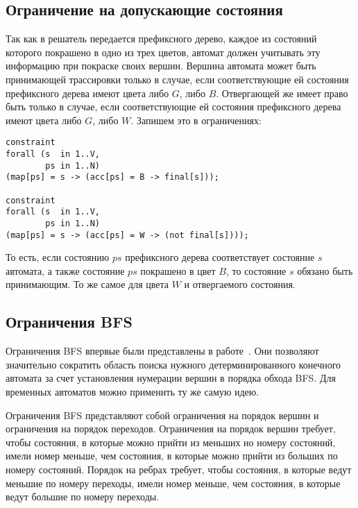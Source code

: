 \documentclass[times,specification,annotation]{itmo-student-thesis}
\begin{document}
\subsection{Ограничение на допускающие состояния}

Так как в решатель передается префиксного дерево, каждое из состояний которого покрашено в одно из трех цветов, автомат должен учитывать эту информацию при покраске своих вершин.
Вершина автомата может быть принимающей трассировки только в случае, если соответствующие ей состояния префиксного дерева имеют цвета либо $G$, либо $B$. Отвергающей же имеет право
быть только в случае, если соответствующие ей состояния префиксного дерева имеют цвета либо $G$, либо $W$. Запишем это в ограничениях:

\begin{lstlisting}[float=!h,language=Mzn,caption={Ограничения на допускающие состояния},label={term}]
constraint
forall (s  in 1..V,
        ps in 1..N)
(map[ps] = s -> (acc[ps] = B -> final[s]));

constraint
forall (s  in 1..V,
        ps in 1..N)
(map[ps] = s -> (acc[ps] = W -> (not final[s])));
\end{lstlisting}

То есть, если состоянию $ps$ префиксного дерева соответствует состояние $s$ автомата, а также состояние $ps$ покрашено в цвет $B$, то состояние $s$ обязано быть принимающим. То же
самое для цвета $W$ и отвергаемого состояния.

\subsection{Ограничения BFS}

Ограничения BFS впервые были представлены в работе~\cite{bfs}. Они позволяют значительно сократить область поиска нужного детерминированного конечного 
автомата за счет установления нумерации вершин в порядка обхода BFS. Для временных автоматов можно применить ту же самую идею.

Ограничения BFS представляют собой ограничения на порядок вершин и ограничения на порядок переходов. Ограничения на порядок вершин требует, чтобы состояния, в которые можно прийти
из меньших но номеру состояний, имели номер меньше, чем состояния, в которые можно прийти из больших по номеру состояний. Порядок на ребрах требует, чтобы состояния, в которые
ведут меньшие по номеру переходы, имели номер меньше, чем состояния, в которые ведут большие по номеру переходы.
\end{document}
